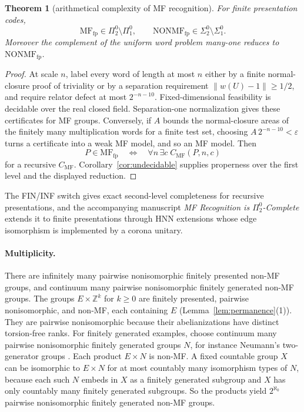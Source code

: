 \documentclass[11pt]{amsart}
\newcommand{\leanverified}[2]{\ignorespaces}
\newtheorem{theorem}{Theorem}[section]
\theoremstyle{definition}
\theoremstyle{remark}
\theoremstyle{plain}
\begin{document}
\begin{theorem}[arithmetical complexity of MF recognition]
\label{thm:mf-arithmetic}
For finite presentation codes,
\[
 \mathrm{MF}_{\mathrm{fp}}\in\Pi^0_2\setminus\Pi^0_1,
 \qquad
 \mathrm{NONMF}_{\mathrm{fp}}\in\Sigma^0_2\setminus\Sigma^0_1.
\]
Moreover the complement of the uniform word problem many-one reduces to
$\mathrm{NONMF}_{\mathrm{fp}}$.
\end{theorem}

\begin{proof}
At scale $n$, label every word of length at most $n$ either by a finite
normal-closure proof of triviality or by a separation requirement
$\|w(U)-1\|\geq1/2$, and require relator defect at most $2^{-n-10}$.
Fixed-dimensional feasibility is decidable over the real closed field.
Separation-one normalization gives these certificates for MF groups.
Conversely, if $A$ bounds the normal-closure areas of the finitely many
multiplication words for a finite test set, choosing
$A\,2^{-n-10}<\varepsilon$ turns a certificate into a weak MF model, and so an
MF model.  Then
\[
 P\in\mathrm{MF}_{\mathrm{fp}}
 \quad\Longleftrightarrow\quad
 \forall n\,\exists c\;C_{\mathrm{MF}}(P,n,c)
\]
for a recursive $C_{\mathrm{MF}}$.  Corollary~\ref{cor:undecidable} supplies
properness over the first level and the displayed reduction.
\end{proof}

The FIN/INF switch gives exact second-level completeness for recursive
presentations, and the accompanying manuscript \emph{MF Recognition is
$\Pi^0_2$-Complete} extends it to finite presentations through HNN
extensions whose edge isomorphism is implemented by a corona unitary.

\paragraph{Multiplicity.}
There are infinitely many pairwise nonisomorphic finitely presented
non-MF groups, and continuum many pairwise nonisomorphic finitely
generated non-MF groups.
The groups $E\times\mathbb Z^{k}$ for $k\ge0$ are
finitely presented, pairwise nonisomorphic, and non-MF, each containing
$E$ (Lemma~\ref{lem:permanence}(1)).  They are pairwise nonisomorphic
because their abelianizations have distinct torsion-free ranks.
\leanverified{Sofic/LiteralProductMultiplicity}{GroupApproximation.LiteralProductMultiplicity.manuscriptInfiniteMultiplicity_literal}
For finitely generated examples, choose continuum many pairwise
nonisomorphic finitely generated groups $N$, for instance Neumann's
two-generator groups \cite{Neumann37}.  Each product $E\times N$ is
non-MF\@.  A fixed countable group $X$ can be isomorphic to
$E\times N$ for at most countably many isomorphism types of $N$,
because each such $N$ embeds in $X$ as a finitely generated subgroup
and $X$ has only countably many finitely generated subgroups.  So
the products yield $2^{\aleph_0}$ pairwise nonisomorphic finitely
generated non-MF groups.
\leanverified{Sofic/ContinuumMultiplicity}{GroupApproximation.ContinuumMultiplicity.manuscriptContinuumMultiplicity}
\leanverified{Monsters/NeumannContinuum}{GroupApproximation.NeumannContinuum.manuscriptContinuumMultiplicityUnconditional}
\end{document}
